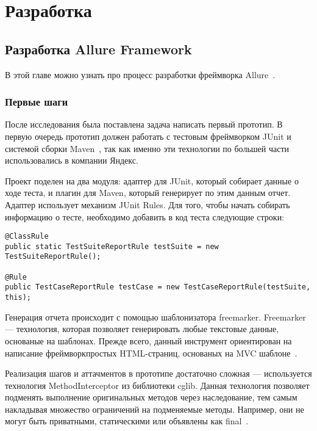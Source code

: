 \chapter{Разработка} 
\label{chapter3}

\section{Разработка Allure Framework}

В этой главе можно узнать про процесс разработки фреймворка Allure~\cite{allure_home}.

\subsection{Первые шаги}

После исследования была поставлена задача написать первый прототип. В первую очередь прототип должен работать с тестовым фреймворком JUnit и системой сборки Maven~\cite{maven_home}, так как именно эти технологии по большей части использовались в компании Яндекс. 

Проект поделен на два модуля: адаптер для JUnit, который собирает данные о ходе теста, и плагин для Maven, который генерирует по этим данным отчет. Адаптер использует механизм JUnit Rules. Для того, чтобы начать собирать информацию о тесте, необходимо добавить в код теста следующие строки:

\begin{lstlisting}[caption=Пример подключения к тестам JUnit Rules.]
@ClassRule
public static TestSuiteReportRule testSuite = new TestSuiteReportRule();

@Rule
public TestCaseReportRule testCase = new TestCaseReportRule(testSuite, this);
\end{lstlisting}


Генерация отчета происходит с помощью шаблонизатора freemarker. Freemarker --- технология, которая позволяет генерировать любые текстовые данные, основаные на шаблонах. Прежде всего, данный инструмент ориентирован на написание фреймворкпростых HTML-страниц, основаных на MVC шаблоне~\cite{freemarker_home}.

Реализация шагов и аттачментов в прототипе достаточно сложная --- используется технология MethodInterceptor из библиотеки cglib. Данная технология позволяет подменять выполнение оригинальных методов через наследование, тем самым накладывая множество ограничений на подменяемые методы. Например, они не могут быть приватными, статическими или объявлены как final~\cite{cglib_home}. 

